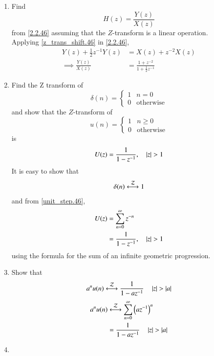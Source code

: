 \documentclass[journal,12pt,twocolumn]{IEEEtran}
\theoremstyle{remark}
\begin{document}
\begin{enumerate}[label=\thesection.\arabic*]
\item Find
%
\begin{equation}
H(z) = \frac{Y(z)}{X(z)}
\end{equation}
from  \eqref{2.2.46} assuming that the $Z$-transform is a linear operation.
\\
\solution  Applying \eqref{z_trans_shift.46} in \eqref{2.2.46},
\begin{align}
Y(z) + \frac{1}{2}z^{-1}Y(z) &= X(z)+z^{-2}X(z)
\\
\implies \frac{Y(z)}{X(z)} &= \frac{1 + z^{-2}}{1 + \frac{1}{2}z^{-1}}
\label{freq_resp.46}
\end{align}
%
\item Find the Z transform of 
\begin{equation}
\delta(n)
=
\begin{cases}
1 & n = 0
\\
0 & \text{otherwise}
\end{cases}
\end{equation}
and show that the $Z$-transform of
\begin{equation}
\label{unit_step.46}
u(n)
=
\begin{cases}
1 & n \ge 0
\\
0 & \text{otherwise}
\end{cases}
\end{equation}
is
\begin{equation}
U(z) = \frac{1}{1-z^{-1}}, \quad \left\vert z\right\vert > 1
\end{equation}
\solution It is easy to show that
\begin{equation}
\delta(n) \system{Z} 1
\end{equation}
and from \eqref{unit_step.46},
\begin{align}
U(z) &= \sum _{n= 0}^{\infty}z^{-n}
\\
&=\frac{1}{1-z^{-1}}, \quad \left\vert z\right\vert > 1
\end{align}
using the formula for the sum of an infinite geometric progression.
%
\item Show that 
\begin{equation}
\label{anun.46}
a^nu(n) \system{Z} \frac{1}{1-az^{-1}} \quad \abs{z} > \abs{a}
\end{equation}
\solution 
\begin{align}
	a^nu(n) &\system{Z} \sum_{n = 0}^{\infty}\brak{az^{-1}}^n \\
			&= \frac{1}{1-az^{-1}} \quad \abs{z} > \abs{a}
\end{align}
%
\item 

\end{enumerate}
\end{document}
